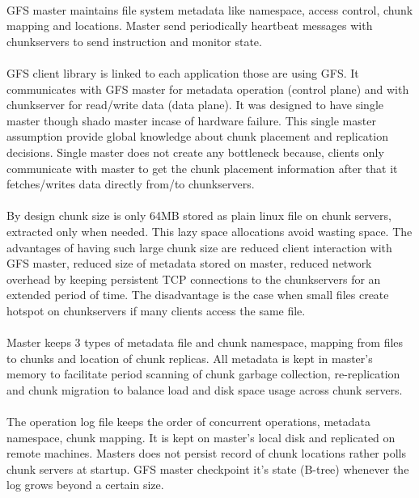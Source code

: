 \documentclass[8pt]{extarticle}
\begin{document}
	\paragraph{}
	GFS master maintains file system metadata like namespace, access control, chunk mapping and locations. Master send periodically heartbeat messages with chunkservers to send instruction and monitor state.
	
	\paragraph{}
	GFS client library is linked to each application those are using GFS. It communicates with GFS master for metadata operation (control plane) and with chunkserver for read/write data (data plane). It was designed to have single master though shado master incase of hardware failure. This single master assumption provide global knowledge about chunk placement and replication decisions. Single master does not create any bottleneck because, clients only communicate with master to get the chunk placement information after that it fetches/writes data directly from/to chunkservers.
	
	\paragraph{}
	By design chunk size is only 64MB stored as plain linux file on chunk servers, extracted only when needed. This lazy space allocations avoid wasting space. The advantages of having such large chunk size are reduced client interaction with GFS master, reduced size of metadata stored on master, reduced network overhead by keeping persistent TCP connections to the chunkservers for an extended period of time. The disadvantage is the case when small files create hotspot on chunkservers if many clients access the same file.
	
	\paragraph{}
	Master keeps 3 types of metadata file and chunk namespace, mapping from files to chunks and location of chunk replicas. All metadata is kept in master's memory to facilitate period scanning of chunk garbage collection, re-replication and chunk migration to balance load and disk space usage across chunk servers.
	
	
	\paragraph{}
	The operation log file keeps the order of concurrent operations, metadata namespace, chunk mapping. It is kept on master's local disk and replicated on remote machines. Masters does not persist record of chunk locations rather polls chunk servers at startup. GFS master checkpoint it's state (B-tree) whenever the log grows beyond a certain size.
	
\end{document}
